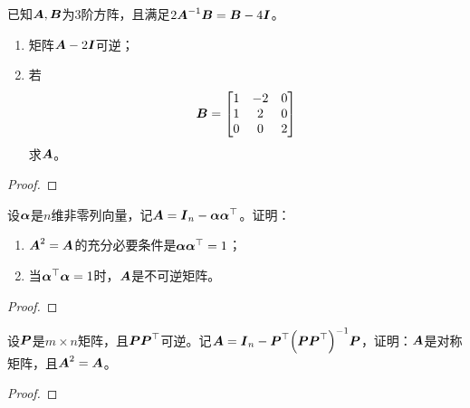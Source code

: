 \begin{problem}\label{problem-2.48}
已知\(\boldsymbol{A},\boldsymbol{B}\)为\(3\)阶方阵，且满足\(2{\boldsymbol{A}}^{-1}\boldsymbol{B}=\boldsymbol{B}-4\boldsymbol{I}\)。
\begin{enumerate}
    \item 矩阵\(\boldsymbol{A}-2\boldsymbol{I}\)可逆；
    \item 若
          \begin{equation*}
              \boldsymbol{B}=
              \begin{bmatrix}
                  1 & -2 & 0 \\
                  1 & 2  & 0 \\
                  0 & 0  & 2
              \end{bmatrix}
          \end{equation*}
          求\(\boldsymbol{A}\)。
\end{enumerate}
\end{problem}
\begin{proof}
\end{proof}

\begin{problem}\label{problem-2.49}
设\(\boldsymbol{\alpha}\)是\(n\)维非零列向量，记\(\boldsymbol{A}=\boldsymbol{I}_n-\boldsymbol{\alpha}\boldsymbol{\alpha}^\top\)。证明：
\begin{enumerate}
    \item \(\boldsymbol{A}^2=\boldsymbol{A}\)的充分必要条件是\(\boldsymbol{\alpha}\boldsymbol{\alpha}^\top=1\)；
    \item 当\(\boldsymbol{\alpha}^\top\boldsymbol{\alpha}=1\)时，\(\boldsymbol{A}\)是不可逆矩阵。
\end{enumerate}
\end{problem}
\begin{proof}
\end{proof}

\begin{problem}\label{problem-2.50}
设\(\boldsymbol{P}\)是\(m\times n\)矩阵，且\(\boldsymbol{P}\boldsymbol{P}^\top\)可逆。记\(\boldsymbol{A}=\boldsymbol{I}_n-\boldsymbol{P}^\top{\left( \boldsymbol{P}\boldsymbol{P}^\top \right)}^{-1}\boldsymbol{P}\)，证明：\(\boldsymbol{A}\)是对称矩阵，且\(\boldsymbol{A}^2=\boldsymbol{A}\)。
\end{problem}
\begin{proof}
\end{proof}

